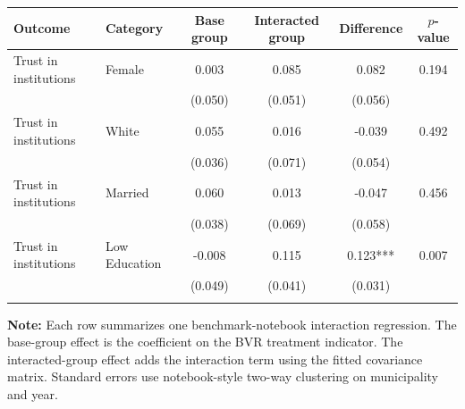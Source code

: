 \begin{tabular*}{\textwidth}{@{\extracolsep{\fill}}llcccc}
\doubletoprule
Outcome & Category & Base group & Interacted group & Difference & $p$-value \\
\midrule
Trust in institutions & Female & 0.003 & 0.085 & 0.082 & 0.194 \\
 &  & (0.050) & (0.051) & (0.056) & \\
Trust in institutions & White & 0.055 & 0.016 & -0.039 & 0.492 \\
 &  & (0.036) & (0.071) & (0.054) & \\
Trust in institutions & Married & 0.060 & 0.013 & -0.047 & 0.456 \\
 &  & (0.038) & (0.069) & (0.058) & \\
Trust in institutions & Low Education & -0.008 & 0.115 & 0.123*** & 0.007 \\
 &  & (0.049) & (0.041) & (0.031) & \\
\doublebottomrule
\end{tabular*}

\begin{minipage}{\textwidth}
\footnotesize
\textbf{Note:} Each row summarizes one benchmark-notebook interaction regression. The base-group effect is the coefficient on the BVR treatment indicator. The interacted-group effect adds the interaction term using the fitted covariance matrix. Standard errors use notebook-style two-way clustering on municipality and year.
\end{minipage}
